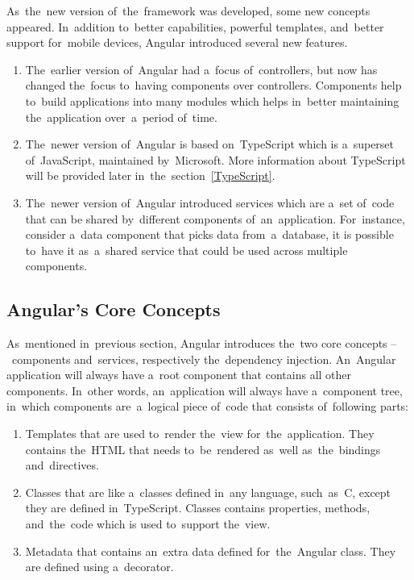 As~the~new version of~the~framework was developed, some new concepts appeared.
In~addition to~better  capabilities, powerful templates,
and~better support for~mobile devices, Angular introduced several new features.

\begin{enumerate}
  \item The~earlier version of~Angular had a~focus of~controllers, but now has
  changed the~focus to~having components over controllers. Components help
  to~build applications into many modules which helps in~better maintaining
  the~application over~a~period of~time.
  \item The~newer version of~Angular is based on~TypeScript which is a~superset
  of~JavaScript, maintained by~Microsoft. More information about TypeScript will
  be provided later in~the~section~\ref{TypeScript}.
  \item The~newer version of~Angular introduced services which are a~set of~code
  that can be shared by~different components of~an~application. For~instance,
  consider a~data component that picks data from~a~database, it is possible
  to~have it as~a~shared service that could be used across multiple
  components.
\end{enumerate}


\subsection{Angular's Core Concepts}
As~mentioned in~previous section, Angular introduces the~two core concepts
--~components and~services, respectively the~dependency injection. An~Angular
application will always have a~root component that contains all other
components. In~other words, an~application will always have a~component tree,
in~which components are~a~logical piece of~code that consists of~following
parts:

\begin{enumerate}
  \item Templates that are used to~render the~view for~the~application. They
  contains the~HTML that needs to~be~rendered as~well as~the~bindings
  and~directives.
  \item Classes that are like a~classes defined in~any language, such~as~C,
  except they are defined in~TypeScript. Classes contains properties, methods,
  and~the~code which is used to~support the~view.
  \item Metadata that contains an~extra data defined for~the~Angular class. They
  are defined using a~decorator.
\end{enumerate}


